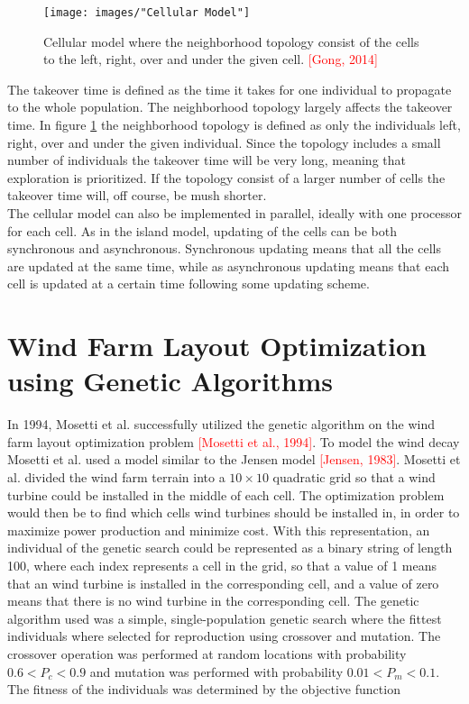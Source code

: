 \begin{figure}[h!]
\begin{center}
\texttt{[image: images/"Cellular Model"]}
\caption{Cellular model where the neighborhood topology consist of the cells to the left, right, over and under the given cell. \textcolor{red}{[Gong, 2014]}}
\label{Cellular model}
\end{center}
\end{figure}


\noindent The takeover time is defined as the time it takes for one individual to propagate to the whole population. The neighborhood topology largely affects the takeover time. In figure \ref{Cellular model} the neighborhood topology is defined as only the individuals left, right, over and under the given individual. Since the topology includes a small number of individuals the takeover time will be very long, meaning that exploration is prioritized. If the topology consist of a larger number of cells the takeover time will, off course, be mush shorter.\\


\noindent The cellular model can also be implemented in parallel, ideally with one processor for each cell. As in the island model, updating of the cells can be both synchronous and asynchronous. Synchronous updating means that all the cells are updated at the same time, while as asynchronous updating means that each cell is updated at a certain time following some updating scheme. 


\section{Wind Farm Layout Optimization using Genetic Algorithms}

In 1994, Mosetti et al. successfully utilized the genetic algorithm on the wind farm layout optimization problem \textcolor{red}{[Mosetti et al., 1994]}. To model the wind decay Mosetti et al. used a model similar to the Jensen model \textcolor{red}{[Jensen, 1983]}. Mosetti et al. divided the wind farm terrain into a $10\times10$ quadratic grid so that a wind turbine could be installed in the middle of each cell. The optimization problem would then be to find which cells wind turbines should be installed in, in order to maximize power production and minimize cost. With this representation, an individual of the genetic search could be represented as a binary string of length 100, where each index represents a cell in the grid, so that a value of 1 means that an wind turbine is installed in the corresponding cell, and a value of zero means that there is no wind turbine in the corresponding cell. The genetic algorithm used was a simple, single-population genetic search where the fittest individuals where selected for reproduction using crossover and mutation. The crossover operation was performed at random locations with probability $0.6 < P_c < 0.9$ and mutation was performed with probability $0.01 < P_m < 0.1$. The fitness of the individuals was determined by the objective function

